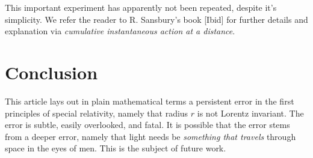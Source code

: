 \documentclass[12pt]{amsart}
\theoremstyle{definition}
\theoremstyle{remark}
\begin{document}
This important experiment has apparently not been repeated, despite it's simplicity. We refer the reader to R. Sansbury's book [Ibid] for further details and explanation via \emph{cumulative instantaneous action at a distance}. 



\section{Conclusion}
This article lays out in plain mathematical terms a persistent error in the first principles of special relativity, namely that radius $r$ is not Lorentz invariant. The error is subtle, easily overlooked, and  fatal. It is possible that the error stems from a deeper error, namely that light needs be \emph{something that travels} through space in the eyes of men. This is the subject of future work. 




























\end{document}
